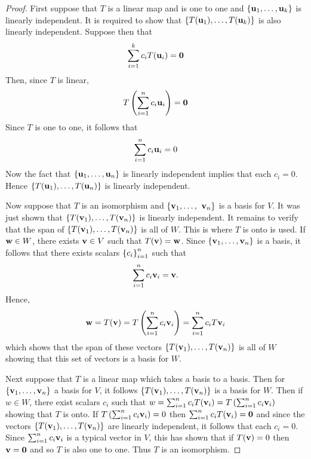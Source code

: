 \begin{proof}
First suppose that $T$ is a linear map and is one to one
and $\left\{\mbox{\bf u}_{1},\ldots,\mbox{\bf u}_{k}\right\} $ is linearly
independent. It is required to show that $\left\{T(\mbox{\bf u}_{1}),\ldots,T(\mbox{\bf u}_{k})\right\} $ is also linearly independent. Suppose then that
\begin{equation*}
\sum_{i=1}^{k}c_{i}T(\mbox{\bf u}_{i})=\mbox{\bf 0}
\end{equation*}
Then, since $T$ is linear,
\begin{equation*}
T\left(\sum_{i=1}^{n}c_{i}\mbox{\bf u}_{i}\right) =\mbox{\bf 0}
\end{equation*}
Since $T$ is one to one, it follows that
\begin{equation*}
\sum_{i=1}^{n}c_{i}\mbox{\bf u}_{i}=0
\end{equation*}
Now the fact that $\left\{\mbox{\bf u}_{1},\ldots,\mbox{\bf u}_{n}\right\} $ is
linearly independent implies that each $c_{i}=0$. Hence $\left\{T(\mbox{\bf u}
_{1}),\ldots,T(\mbox{\bf u}_{n})\right\} $ is linearly independent.

Now suppose that $T$ is an isomorphism and $\set{\vect{v}_{1},\ldots,\vect{
v}_{n}} $ is a basis for $V$. It was just shown that $\left\{T(\mbox{\bf v}
_{1}),\ldots,T(\mbox{\bf v}_{n})\right\} $ is linearly independent. It remains to
verify that the span of $\left\{T(\mbox{\bf v}_{1}),\ldots,T(\mbox{\bf v}_{n})\right\} $
is all of $W$. This is where $T$ is onto is used. If $\mbox{\bf w}\in W$, there
exists $\mbox{\bf v}\in V$ such that $T(\mbox{\bf v})=\mbox{\bf w}$. Since $\set{\vect{v}
_{1},\ldots,\vect{v}_{n}} $ is a basis, it follows that there exists
scalars $\left\{c_{i}\right\} _{i=1}^{n}$ such that
\begin{equation*}
\sum_{i=1}^{n}c_{i}\mbox{\bf v}_{i}=\mbox{\bf v}.
\end{equation*}
Hence,
\begin{equation*}
\mbox{\bf w}=T(\mbox{\bf v})=T\left(\sum_{i=1}^{n}c_{i}\mbox{\bf v}_{i}\right)
=\sum_{i=1}^{n}c_{i}T\mbox{\bf v}_{i}
\end{equation*}
which shows that the span of these vectors $\left\{T(\mbox{\bf v}_{1}),\ldots,T
(\mbox{\bf v}_{n})\right\} $ is all of $W$ showing that this set of vectors is a
basis for $W$.

Next suppose that $T$ is a linear map which takes a basis to a basis. Then
for $\set{\vect{v}_{1},\ldots,\vect{v}_{n}} $ a basis for $V$, it
follows $\left\{T(\mbox{\bf v}_{1}),\ldots,T(\mbox{\bf v}_{n})\right\} $ is a basis for $
W$. Then if $w\in W$, there exist scalars $c_{i}$ such that $
w=\sum_{i=1}^{n}c_{i}T(\mbox{\bf v}_{i})=T\left(\sum_{i=1}^{n}c_{i}\mbox{\bf v}_{i}\right) $
showing that $T$ is onto. If $T\left(\sum_{i=1}^{n}c_{i}\mbox{\bf v}_{i}\right) =0$
then $\sum_{i=1}^{n}c_{i}T(\mbox{\bf v}_{i})=\mbox{\bf 0}$ and since the vectors $\left\{T(\mbox{\bf v}
_{1}),\ldots,T(\mbox{\bf v}_{n})\right\} $ are linearly independent, it follows
that each $c_{i}=0$. Since $\sum_{i=1}^{n}c_{i}\mbox{\bf v}_{i}$ is a typical vector in
$V$, this has shown that if $T(\mbox{\bf v})=0$ then $\mbox{\bf v}=\mbox{\bf 0}$ and so $T$ is also one to one.
Thus $T$ is an isomorphism.
\end{proof}

